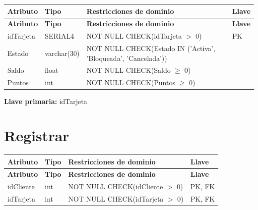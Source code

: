 \documentclass[12pt]{article}
\begin{document}
\begin{longtable}{p{3.5cm} p{2.5cm} p{7.5cm} p{1.5cm}}
\label{tab:tarjeta}\\
\toprule
\textbf{Atributo} & \textbf{Tipo} & \textbf{Restricciones de dominio} & \textbf{Llave} \\
\midrule
\endfirsthead

\toprule
\textbf{Atributo} & \textbf{Tipo} & \textbf{Restricciones de dominio} & \textbf{Llave} \\
\midrule
\endhead
\bottomrule
\endfoot

idTarjeta 
& SERIAL4 
& NOT NULL \newline CHECK(idTarjeta $>$ 0)
& PK \\

Estado 
& varchar(30) 
& NOT NULL \newline CHECK(Estado IN ('Activa', 'Bloqueada', 'Cancelada'))
&  \\

Saldo 
& float 
& NOT NULL \newline CHECK(Saldo $\geq$ 0)
&  \\

Puntos 
& int 
& NOT NULL \newline CHECK(Puntos $\geq$ 0)
&  \\

\end{longtable}

\vspace{2pt}
\textbf{Llave primaria:} idTarjeta\\


\section*{Registrar}

\begin{longtable}{p{3.5cm} p{2.5cm} p{7.5cm} p{1.5cm}}
\label{tab:registrar}\\
\toprule
\textbf{Atributo} & \textbf{Tipo} & \textbf{Restricciones de dominio} & \textbf{Llave} \\
\midrule
\endfirsthead

\toprule
\textbf{Atributo} & \textbf{Tipo} & \textbf{Restricciones de dominio} & \textbf{Llave} \\
\midrule
\endhead
\bottomrule
\endfoot

idCliente 
& int 
& NOT NULL \newline CHECK(idCliente $>$ 0)
& PK, FK \\

idTarjeta 
& int 
& NOT NULL \newline CHECK(idTarjeta $>$ 0)
& PK, FK \\

\end{longtable}
\end{document}
